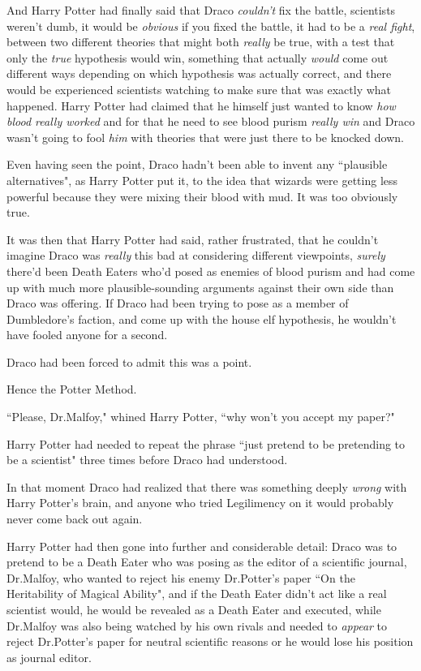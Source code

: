 And Harry Potter had finally said that Draco \emph{couldn't} fix the battle, scientists weren't dumb, it would be \emph{obvious} if you fixed the battle, it had to be a \emph{real fight}, between two different theories that might both \emph{really} be true, with a test that only the \emph{true} hypothesis would win, something that actually \emph{would} come out different ways depending on which hypothesis was actually correct, and there would be experienced scientists watching to make sure that was exactly what happened. Harry Potter had claimed that he himself just wanted to know \emph{how blood really worked} and for that he need to see blood purism \emph{really win} and Draco wasn't going to fool \emph{him} with theories that were just there to be knocked down.

Even having seen the point, Draco hadn't been able to invent any ``plausible alternatives", as Harry Potter put it, to the idea that wizards were getting less powerful because they were mixing their blood with mud. It was too obviously true.

It was then that Harry Potter had said, rather frustrated, that he couldn't imagine Draco was \emph{really} this bad at considering different viewpoints, \emph{surely} there'd been Death Eaters who'd posed as enemies of blood purism and had come up with much more plausible-sounding arguments against their own side than Draco was offering. If Draco had been trying to pose as a member of Dumbledore's faction, and come up with the house elf hypothesis, he wouldn't have fooled anyone for a second.

Draco had been forced to admit this was a point.

Hence the Potter Method.

``Please, Dr.\?Malfoy," whined Harry Potter, ``why won't you accept my paper?"

Harry Potter had needed to repeat the phrase ``just pretend to be pretending to be a scientist" three times before Draco had understood.

In that moment Draco had realized that there was something deeply \emph{wrong} with Harry Potter's brain, and anyone who tried Legilimency on it would probably never come back out again.

Harry Potter had then gone into further and considerable detail: Draco was to pretend to be a Death Eater who was posing as the editor of a scientific journal, Dr.\?Malfoy, who wanted to reject his enemy Dr.\?Potter's paper ``On the Heritability of Magical Ability", and if the Death Eater didn't act like a real scientist would, he would be revealed as a Death Eater and executed, while Dr.\?Malfoy was also being watched by his own rivals and needed to \emph{appear} to reject Dr.\?Potter's paper for neutral scientific reasons or he would lose his position as journal editor.


